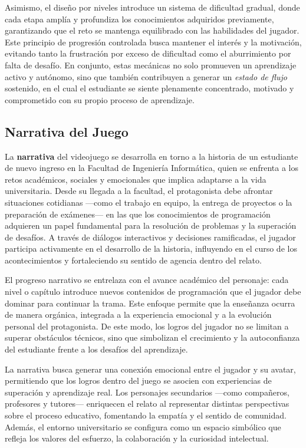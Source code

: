Asimismo, el diseño por niveles introduce un sistema de dificultad gradual, donde cada etapa amplía y profundiza los conocimientos adquiridos previamente, garantizando que el reto se mantenga equilibrado con las habilidades del jugador. Este principio de progresión controlada busca mantener el interés y la motivación, evitando tanto la frustración por exceso de dificultad como el aburrimiento por falta de desafío. En conjunto, estas mecánicas no solo promueven un aprendizaje activo y autónomo, sino que también contribuyen a generar un \textit{estado de flujo} sostenido, en el cual el estudiante se siente plenamente concentrado, motivado y comprometido con su propio proceso de aprendizaje.


\subsection{Narrativa del Juego}

La \textbf{narrativa} del videojuego se desarrolla en torno a la historia de un estudiante de nuevo ingreso en la Facultad de Ingeniería Informática, quien se enfrenta a los retos académicos, sociales y emocionales que implica adaptarse a la vida universitaria. Desde su llegada a la facultad, el protagonista debe afrontar situaciones cotidianas —como el trabajo en equipo, la entrega de proyectos o la preparación de exámenes— en las que los conocimientos de programación adquieren un papel fundamental para la resolución de problemas y la superación de desafíos. A través de diálogos interactivos y decisiones ramificadas, el jugador participa activamente en el desarrollo de la historia, influyendo en el curso de los acontecimientos y fortaleciendo su sentido de agencia dentro del relato.  

El progreso narrativo se entrelaza con el avance académico del personaje: cada nivel o capítulo introduce nuevos contenidos de programación que el jugador debe dominar para continuar la trama. Este enfoque permite que la enseñanza ocurra de manera orgánica, integrada a la experiencia emocional y a la evolución personal del protagonista. De este modo, los logros del jugador no se limitan a superar obstáculos técnicos, sino que simbolizan el crecimiento y la autoconfianza del estudiante frente a los desafíos del aprendizaje.  

La narrativa busca generar una conexión emocional entre el jugador y su avatar, permitiendo que los logros dentro del juego se asocien con experiencias de superación y aprendizaje real. Los personajes secundarios —como compañeros, profesores y tutores— enriquecen el relato al representar distintas perspectivas sobre el proceso educativo, fomentando la empatía y el sentido de comunidad. Además, el entorno universitario se configura como un espacio simbólico que refleja los valores del esfuerzo, la colaboración y la curiosidad intelectual.  

